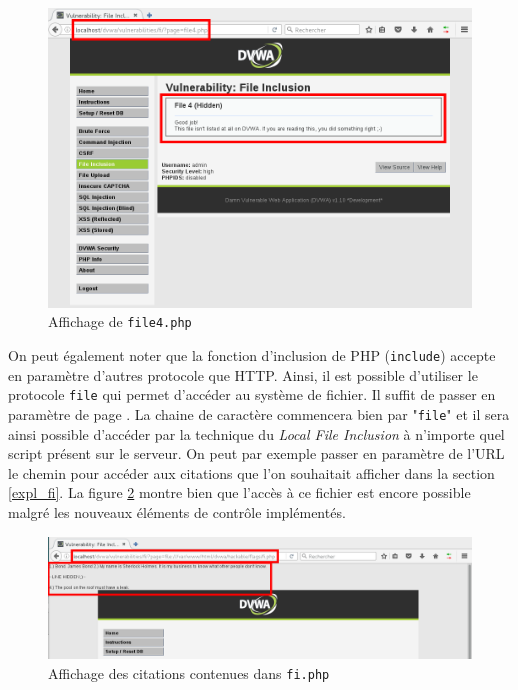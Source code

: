 \begin{figure}[!h]
\begin{center}
\includegraphics[scale=.45]{images/fi8.png}

\caption{Affichage de \texttt{file4.php}}
\label{fi_dvwa8}
\end{center}
\end{figure}

On peut également noter que la fonction d'inclusion de PHP (\texttt{include}) accepte en paramètre d'autres protocole que HTTP. Ainsi, il est possible d'utiliser le protocole \texttt{file} qui permet d'accéder au système de fichier. Il suffit de passer en paramètre de page . La chaine de caractère commencera bien par "\texttt{file}" et il sera ainsi possible d'accéder par la technique du \textit{Local File Inclusion} à n'importe quel script présent sur le serveur. On peut par exemple passer en paramètre de l'URL le chemin  pour accéder aux citations que l'on souhaitait afficher dans la section \ref{expl_fi}. La figure \ref{fi_dvwa9} montre bien que l'accès à ce fichier est encore possible malgré les nouveaux éléments de contrôle implémentés.\\

\begin{figure}[!h]
\begin{center}
\includegraphics[scale=.4]{images/fi9.png}

\caption{Affichage des citations contenues dans \texttt{fi.php}}
\label{fi_dvwa9}
\end{center}
\end{figure}



